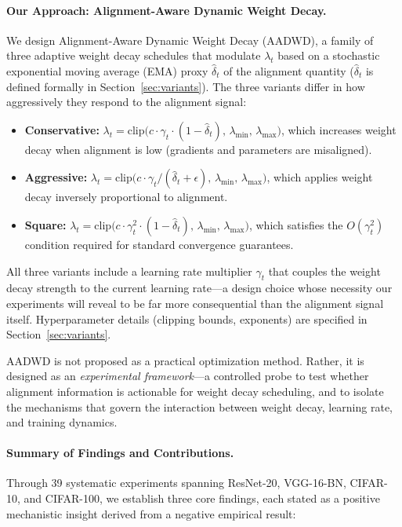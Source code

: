 \documentclass{article}
\begin{document}
\paragraph{Our Approach: Alignment-Aware Dynamic Weight Decay.}
We design Alignment-Aware Dynamic Weight Decay (AADWD), a family of three adaptive
weight decay schedules that modulate $\lambda_t$ based on a stochastic exponential
moving average (EMA) proxy $\hat{\delta}_t$ of the alignment quantity ($\hat{\delta}_t$
is defined formally in Section~\ref{sec:variants}).
The three variants differ in how aggressively they respond to the alignment signal:
\begin{itemize}
  \item \textbf{Conservative:}
        $\lambda_t = \mathrm{clip}\bigl(c \cdot \gamma_t \cdot (1 - \hat{\delta}_t),\,
        \lambda_{\min},\, \lambda_{\max}\bigr)$,
        which increases weight decay when alignment is low (gradients and parameters
        are misaligned).
  \item \textbf{Aggressive:}
        $\lambda_t = \mathrm{clip}\bigl(c \cdot \gamma_t / (\hat{\delta}_t + \epsilon),\,
        \lambda_{\min},\, \lambda_{\max}\bigr)$,
        which applies weight decay inversely proportional to alignment.
  \item \textbf{Square:}
        $\lambda_t = \mathrm{clip}\bigl(c \cdot \gamma_t^2 \cdot (1 - \hat{\delta}_t),\,
        \lambda_{\min},\, \lambda_{\max}\bigr)$,
        which satisfies the $O(\gamma_t^2)$ condition required for standard convergence
        guarantees.
\end{itemize}
All three variants include a learning rate multiplier $\gamma_t$ that couples the
weight decay strength to the current learning rate---a design choice whose necessity
our experiments will reveal to be far more consequential than the alignment signal
itself.
Hyperparameter details (clipping bounds, exponents) are specified in
Section~\ref{sec:variants}.

AADWD is not proposed as a practical optimization method.
Rather, it is designed as an \emph{experimental framework}---a controlled probe to
test whether alignment information is actionable for weight decay scheduling, and to
isolate the mechanisms that govern the interaction between weight decay, learning
rate, and training dynamics.

\paragraph{Summary of Findings and Contributions.}
Through 39 systematic experiments spanning ResNet-20, VGG-16-BN, CIFAR-10, and
CIFAR-100, we establish three core findings, each stated as a positive mechanistic
insight derived from a negative empirical result:
\end{document}

